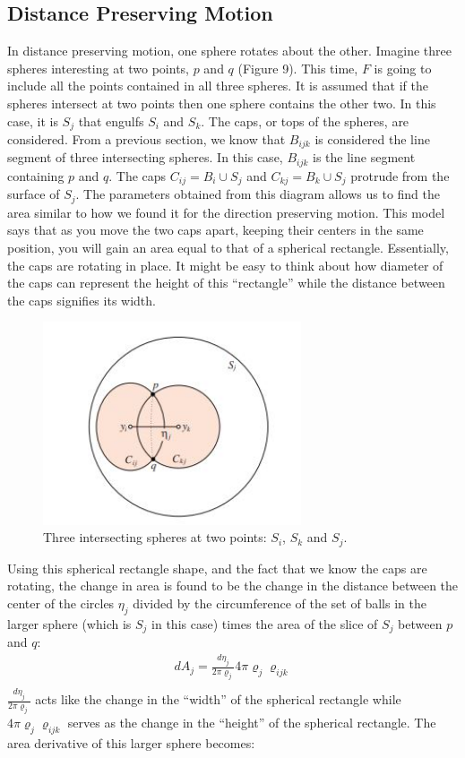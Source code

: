 \documentclass{article}
\begin{document}
\subsection{Distance Preserving Motion}
In distance preserving motion, one sphere rotates about the other. Imagine three spheres interesting at two points, $p$ and $q$ (Figure 9). This time, $F$ is going to include all the points contained in all three spheres. It is assumed that if the spheres intersect at two points then one sphere contains the other two. In this case, it is $S_j$ that engulfs $S_i$ and $S_k$. The caps, or tops of the spheres, are considered. From a previous section, we know that $B_{ijk}$ is considered the line segment of three intersecting spheres. In this case, $B_{ijk}$ is the line segment containing $p$ and $q$. The caps $C_{ij} = B_i \cup S_j$ and $C_{kj} = B_k \cup S_j$ protrude from the surface of $S_j$. The parameters obtained from this diagram allows us to find the area similar to how we found it for the direction preserving motion. This model says that as you move the two caps apart, keeping their centers in the same position, you will gain an area equal to that of a spherical rectangle. Essentially, the caps are rotating in place. It might be easy to think about how diameter of the caps can represent the height of this “rectangle” while the distance between the caps signifies its width.
\begin{figure}[h!]
\caption{Three intersecting spheres at two points: $S_i$, $S_k$ and $S_j$.\cite{Bryant}}
\centerline{\includegraphics[width=3in]{Figure7}}
\end{figure}

Using this spherical rectangle shape, and the fact that we know the caps are rotating, the change in area is found to be the change in the distance between the center of the circles $\eta_j$ divided by the circumference of the set of balls in the larger sphere (which is $S_j$ in this case) times the area of the slice of $S_j$ between $p$ and $q$: 
\begin{align*}
dA_j = \frac{d\eta_j}{2\pi\varrho_j}4\pi\varrho_j\varrho_{ijk}\\
\end{align*}
$\frac{d\eta_j}{2\pi\varrho_j}$ acts like the change in the “width” of the spherical rectangle while $4\pi\varrho_j\varrho_{ijk}$ serves as the change in the “height” of the spherical rectangle. The area derivative of this larger sphere becomes:
\end{document}
